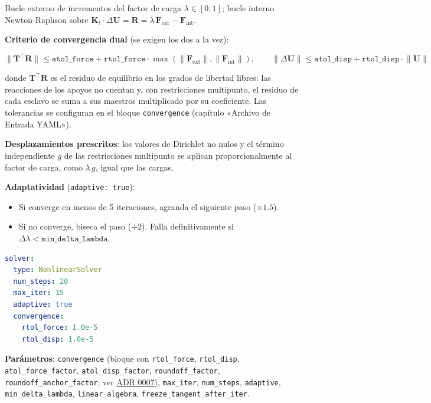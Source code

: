 \documentclass[11pt,oneside]{report}
\begin{document}
Bucle externo de incrementos del factor de carga $\lambda \in [0, 1]$; bucle interno Newton-Raphson sobre $\mathbf K_t \cdot \Delta\mathbf U = \mathbf R = \lambda\,\mathbf F_{\text{ext}} - \mathbf F_{\text{int}}$.

\textbf{Criterio de convergencia dual} (se exigen los dos a la vez):

\[
\lVert\mathbf T^\top\mathbf R\rVert \le \texttt{atol\_force} + \texttt{rtol\_force}\cdot\max(\lVert\mathbf F_{\text{ext}}\rVert, \lVert\mathbf F_{\text{int}}\rVert), \qquad \lVert\Delta\mathbf U\rVert \le \texttt{atol\_disp} + \texttt{rtol\_disp}\cdot\lVert\mathbf U\rVert
\]

donde $\mathbf T^\top\mathbf R$ es el residuo de equilibrio en los grados de libertad libres: las reacciones de los apoyos no cuentan y, con restricciones multipunto, el residuo de cada esclavo se suma a sus maestros multiplicado por su coeficiente. Las tolerancias se configuran en el bloque \texttt{convergence} (capítulo «Archivo de Entrada YAML»).

\textbf{Desplazamientos prescritos}: los valores de Dirichlet no nulos y el término independiente $g$ de las restricciones multipunto se aplican proporcionalmente al factor de carga, como $\lambda\,g$, igual que las cargas.

\textbf{Adaptatividad} (\texttt{adaptive: true}):

\begin{itemize}
  \item Si converge en menos de 5 iteraciones, agranda el siguiente paso ($\times 1.5$).
  \item Si no converge, biseca el paso ($\div 2$). Falla definitivamente si $\Delta\lambda < \texttt{min\_delta\_lambda}$.
\end{itemize}

\begin{lstlisting}[language=yaml]
solver:
  type: NonlinearSolver
  num_steps: 20
  max_iter: 15
  adaptive: true
  convergence:
    rtol_force: 1.0e-5
    rtol_disp: 1.0e-5

\end{lstlisting}

\textbf{Parámetros}: \texttt{convergence} (bloque con \texttt{rtol\_force}, \texttt{rtol\_disp}, \texttt{atol\_\allowbreak{}force\_\allowbreak{}factor}, \texttt{atol\_disp\_factor}, \texttt{roundoff\_factor}, \texttt{roundoff\_\allowbreak{}anchor\_\allowbreak{}factor}; ver \href{https://github.com/jretamav/solidum-fem/blob/main/docs/adr/0007-tolerancias-convergencia-solvers.md}{ADR 0007}), \texttt{max\_iter}, \texttt{num\_steps}, \texttt{adaptive}, \texttt{min\_delta\_lambda}, \texttt{linear\_algebra}, \texttt{freeze\_\allowbreak{}tangent\_\allowbreak{}after\_\allowbreak{}iter}.
\end{document}
